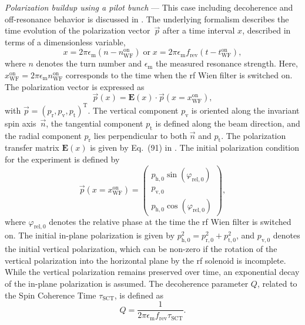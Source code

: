 \documentclass[
    10pt,
    twocolumn,
    secnumarabic,
    amssymb,
    nobibnotes,
    aps,
    prl,

    longbibliography,
    superscriptaddress
    ]{revtex4-2}
\newcommand{\phirelzero}{\varphi_{\mathrm{rel,0}}}
\newcommand{\fc}{f_\mathrm{rev} }
\begin{document}
\textit{Polarization buildup using a pilot bunch} ---
This case including decoherence and off-resonance behavior is discussed in \cite{PhysRevAccelBeams.27.111002}.
The underlying formalism describes the time evolution of the polarization vector~$\vec{p}$ after a time interval $x$, described in terms of a dimensionless variable,
\begin{equation}
x = 2\pi \epsilon_{\text{m}} (n - n_{\text{WF}}^{\text{on}})
\; \text{or} \;
x = 2\pi \epsilon_{\text{m}} \fc (t - t_{\text{WF}}^{\text{on}}),
\end{equation}
where $n$ denotes the turn number and $\epsilon_{\text{m}}$ the measured resonance strength. Here, $x_{\text{WF}}^{\text{on}} = 2\pi \epsilon_{\text{m}} n_{\text{WF}}^{\text{on}}$ corresponds to the time when the rf Wien filter is switched on.
The polarization vector is expressed as
\begin{equation}
  \vec{p}(x) = \mathbf{E}(x) \cdot \vec{p}(x = x_{\text{WF}}^{\text{on}}),
\end{equation}
with $\vec{p} = (p_{\text{r}}, p_{\text{v}}, p_{\text{t}})^{\text{T}}$.
The vertical component $p_{\text{v}}$ is oriented along the invariant spin axis~$\vec{n}$, the tangential component $p_{\text{t}}$ is defined along the beam direction, and the radial component $p_{\text{r}}$ lies perpendicular to both $\vec{n}$ and $p_{\text{t}}$.
The polarization transfer matrix $\mathbf{E}(x)$ is given by Eq.~(91) in \cite{PhysRevAccelBeams.27.111002}.
The initial polarization condition for the experiment is defined by
\begin{equation}
  \vec{p}(x = x_{\text{WF}}^\text{on}) =
  \left(\begin{array}{c}
    p_{\text{h},0}\sin(\phirelzero)\\
    p_{\text{v},0}\\
    p_{\text{h},0}\cos(\phirelzero)
  \end{array}\right),
\end{equation}
where $\phirelzero$ denotes the relative phase at the time the rf Wien filter is switched on. The initial in-plane polarization is given by $p_{\text{h},0}^2=p_{\text{r},0}^2+p_{\text{t},0}^2$, and $p_{\text{v},0}$ denotes the initial vertical polarization, which can be non-zero if the rotation of the vertical polarization into the horizontal plane by the rf solenoid is incomplete.
While the vertical polarization remains preserved over time, an exponential decay of the in-plane polarization is assumed. The decoherence parameter $Q$, related to the Spin Coherence Time $\tau_{\text{SCT}}$, is defined as
\begin{equation}
Q=\frac{1}{2\pi\epsilon_{\text{m}}\fc \tau_{\text{SCT}}}.
\end{equation}
\end{document}
